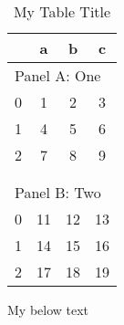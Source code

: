\begin{table}
\centering
\begin{threeparttable}
\caption{My Table Title}
\begin{tabular}{lccc}
\toprule
  & a & b & c\\
\midrule
\multicolumn{4}{l}{Panel A: One}\\
0 & 1 & 2 & 3 \\
1 & 4 & 5 & 6 \\
2 & 7 & 8 & 9 \\
  &   &   &  \\
  &   &   &  \\
\multicolumn{4}{l}{Panel B: Two}\\
0 & 11 & 12 & 13 \\
1 & 14 & 15 & 16 \\
2 & 17 & 18 & 19 \\
\bottomrule

\end{tabular}
\begin{tablenotes}
My below text
\end{tablenotes}
\end{threeparttable}
\end{table}